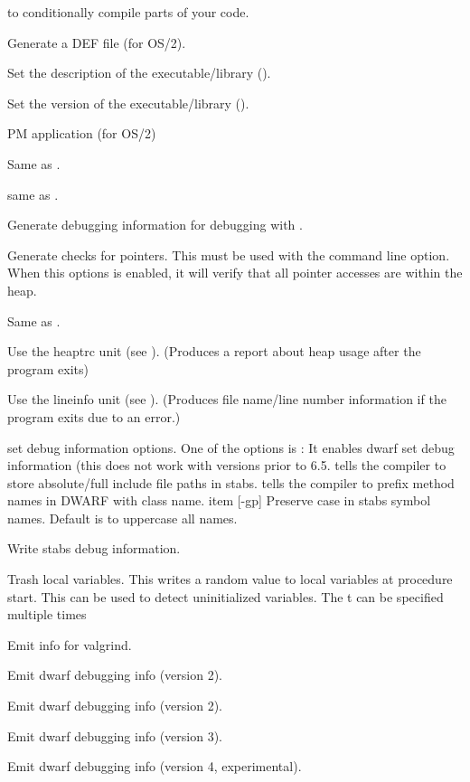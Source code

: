 \begin{description}
to conditionally compile parts of your code.
\item [-D] Generate a DEF file (for OS/2).
\item [-Dd] Set the description of the executable/library (\windows).
\item [-Dv] Set the version of the executable/library (\windows).
\item [-Dw] PM application (for OS/2)
\item [-E]  Same as .
\item [-fPIC] same as .
\item [-g]  Generate debugging information for debugging with
.
\item [-gc] Generate checks for pointers. This must be used with the
 command line option. When this options is enabled, it will verify 
that all pointer accesses are within the heap.
\item [-gg] Same as .
\item [-gh] Use the heaptrc unit (see \unitsref). (Produces a report
about heap usage after the program exits)
\item [-gl] Use the lineinfo unit (see \unitsref). (Produces file
name/line number information if the program exits due to an error.)
\item[-goXXX] set debug information options. One of the options is
: It enables dwarf set debug information (this does not work
with  versions prior to 6.5.   tells the compiler to store absolute/full include file paths in stabs.
 tells the compiler to prefix method names in DWARF with class name.
item [-gp] Preserve case in stabs symbol names. Default is to uppercase all
names.
\item [-gs] Write stabs debug information.
\item [-gt] Trash local variables. This writes a random value to local
variables at procedure start. This can be used to detect uninitialized
variables. The t can be specified multiple times
\item [-gv] Emit info for valgrind.
\item [-gw] Emit dwarf debugging info (version 2).
\item [-gw2] Emit dwarf debugging info (version 2).
\item [-gw3] Emit dwarf debugging info (version 3).
\item [-gw4] Emit dwarf debugging info (version 4, experimental).

\end{description}
